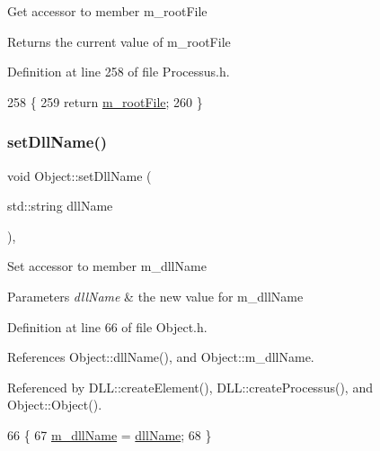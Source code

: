 Get accessor to member m\+\_\+root\+File \begin{DoxyReturn}{Returns}
the current value of m\+\_\+root\+File 
\end{DoxyReturn}


Definition at line 258 of file Processus.\+h.


\begin{DoxyCode}
258                      \{
259     \textcolor{keywordflow}{return} \hyperlink{classProcessus_a76114f8cf2111e910c323a7ae05a015d}{m\_rootFile};
260   \}
\end{DoxyCode}
\mbox{\label{classObject_a870c5af919958c2136623b2d7816d123}} 
\subsubsection{\texorpdfstring{set\+Dll\+Name()}{setDllName()}}
{\footnotesize\ttfamily void Object\+::set\+Dll\+Name (\begin{DoxyParamCaption}\item[{std\+::string}]{dll\+Name }\end{DoxyParamCaption})\hspace{0.3cm}{\ttfamily [inline]}, {\ttfamily [inherited]}}

Set accessor to member m\+\_\+dll\+Name 
\begin{DoxyParams}{Parameters}
{\em dll\+Name} & the new value for m\+\_\+dll\+Name \\
\hline
\end{DoxyParams}


Definition at line 66 of file Object.\+h.



References Object\+::dll\+Name(), and Object\+::m\+\_\+dll\+Name.



Referenced by D\+L\+L\+::create\+Element(), D\+L\+L\+::create\+Processus(), and Object\+::\+Object().


\begin{DoxyCode}
66                                       \{
67     \hyperlink{classObject_a01afbeacebb8db6831559972ec362eb3}{m\_dllName} = \hyperlink{classObject_a2e3947f2870094c332d7454117f3ec63}{dllName};
68   \}
\end{DoxyCode}
\mbox{\label{classProcessus_a8ddef94227d83d9dae2cd49aebc33353}} 
